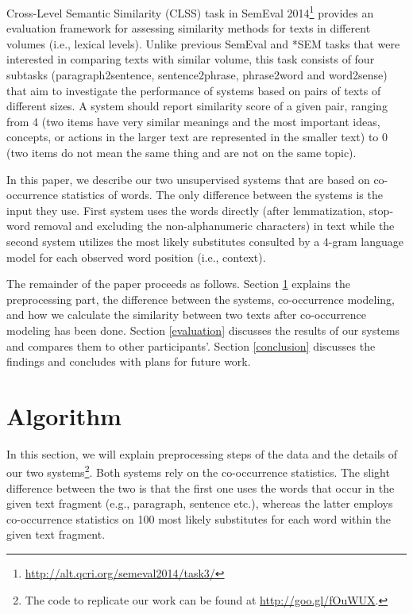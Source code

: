 \documentclass[11pt]{article}
\begin{document}
Cross-Level Semantic Similarity (CLSS) task in SemEval 2014\footnote{\url{http://alt.qcri.org/semeval2014/task3/}} \cite{jurgens14task3} provides an evaluation framework for assessing similarity methods for texts in different volumes (i.e., lexical levels). Unlike previous SemEval and *SEM tasks that were interested in comparing texts with similar volume, this task consists of four subtasks (paragraph2sentence, sentence2phrase, phrase2word and word2sense) that aim to investigate the performance of systems based on pairs of texts of different sizes. A system should report similarity score of a given pair, ranging from 4 (two items have very similar meanings and the most important ideas, concepts, or actions in the larger text are represented in the smaller text) to 0 (two items do not mean the same thing and are not on the same topic).

In this paper, we describe our two unsupervised systems that are based on co-occurrence statistics of words. The only difference between the systems is the input they use. First system uses the words directly (after lemmatization, stop-word removal and excluding the non-alphanumeric characters) in text while the second system utilizes the most likely substitutes consulted by a 4-gram language model for each observed word position (i.e., context). 


The remainder of the paper proceeds as follows. Section \ref{algorithm} explains the preprocessing part, the difference between the systems, co-occurrence modeling, and how we calculate the similarity between two texts after co-occurrence modeling has been done. Section \ref{evaluation} discusses the results of our systems and compares them to other participants'. Section \ref{conclusion} discusses the findings and concludes with plans for future work.

\section{Algorithm}
\label{algorithm}
In this section, we will explain preprocessing steps of the data and the details of our two systems\footnote{The code to replicate our work can be found at \url{http://goo.gl/fOuWUX}.}. Both systems rely on the co-occurrence statistics. The slight difference between the two is that the first one uses the words that occur in the given text fragment (e.g., paragraph, sentence etc.), whereas the latter employs co-occurrence statistics on 100 most likely substitutes for each word within the given text fragment. 
\end{document}
